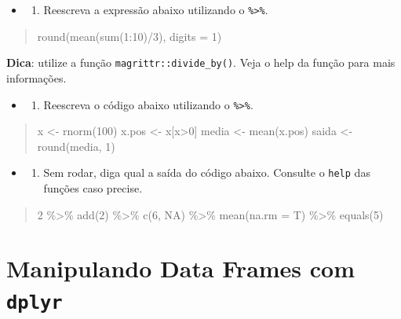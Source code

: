 \documentclass[]{book}
\providecommand{\tightlist}{%
  \setlength{\itemsep}{0pt}\setlength{\parskip}{0pt}}
\begin{document}
\begin{itemize}
\item
  \begin{enumerate}
  \def\labelenumi{\arabic{enumi}.}
  \tightlist
  \item
    Reescreva a expressão abaixo utilizando o \texttt{\%\textgreater{}\%}.
  \end{enumerate}
\end{itemize}

\begin{quote}
round(mean(sum(1:10)/3), digits = 1)
\end{quote}

\textbf{Dica}: utilize a função \texttt{magrittr::divide\_by()}. Veja o help da função para mais informações.

\begin{itemize}
\item
  \begin{enumerate}
  \def\labelenumi{\arabic{enumi}.}
  \setcounter{enumi}{1}
  \tightlist
  \item
    Reescreva o código abaixo utilizando o \texttt{\%\textgreater{}\%}.
  \end{enumerate}
\end{itemize}

\begin{quote}
x \textless- rnorm(100)
x.pos \textless- x{[}x\textgreater0{]}
media \textless- mean(x.pos)
saida \textless- round(media, 1)
\end{quote}

\begin{itemize}
\item
  \begin{enumerate}
  \def\labelenumi{\arabic{enumi}.}
  \setcounter{enumi}{2}
  \tightlist
  \item
    Sem rodar, diga qual a saída do código abaixo. Consulte o \texttt{help} das funções caso precise.
  \end{enumerate}
\end{itemize}

\begin{quote}
2 \%\textgreater\%
add(2) \%\textgreater\%
c(6, NA) \%\textgreater\%
mean(na.rm = T) \%\textgreater\%
equals(5)
\end{quote}

\hypertarget{method}{%
\chapter{\texorpdfstring{Manipulando Data Frames com \texttt{dplyr}}{Manipulando Data Frames com dplyr}}\label{method}}
\end{document}
